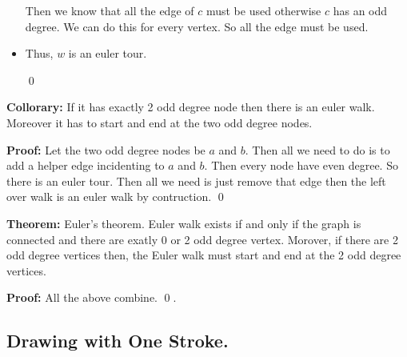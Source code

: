 \documentclass[a4paper, 12pt]{article}
\newcommand{\theorem}{\vspace{1em}\noindent\textbf{Theorem:} }
\newcommand{\collorary}{\vspace{1em}\noindent\textbf{Theorem:} }
\renewcommand{\proof}{\vspace{0.5em}\noindent\textbf{Proof:} }
\renewcommand{\collorary}{\vspace{1em}\noindent\textbf{Collorary:} }
\newcommand{\qedd}{\qed\newline}
\begin{document}
\begin{itemize}
\begin{center}
					\end{center}
			Then we know that all the edge of $c$ must be used otherwise $c$ has an odd degree. We can do this for every vertex. So all the edge must be used.
			
			\item Thus, $w$ is an euler tour.

		\qedd
		
	\end{itemize}
			\collorary If it has exactly 2 odd degree node then there is an euler walk. Moreover it has to start and end at the two odd degree nodes.
			
			\proof Let the two odd degree nodes be $a$ and $b$. Then all we need to do is to add a helper edge incidenting to $a$ and $b$. Then every node have even degree. So there is an euler tour. Then all we need is just remove that edge then the left over walk is an euler walk by contruction.
			\qedd
			
	\theorem Euler's theorem. Euler walk exists if and only if the graph is connected and there are exatly 0 or 2 odd degree vertex. Morover, if there are 2 odd degree vertices then, the Euler walk must start and end at the 2 odd degree vertices.
	
	\proof All the above combine.
	\qedd.
	
	\subsection*{Drawing with One Stroke.}
	
\end{document}
